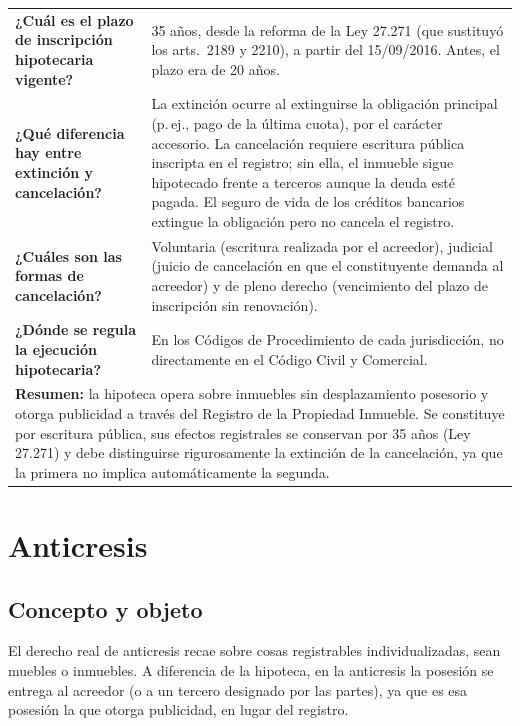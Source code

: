 \documentclass[12pt,oneside]{book}
\begin{document}
\begin{longtable}{p{}p{}}
\textbf{¿Cuál es el plazo de inscripción hipotecaria vigente?} &
35 años, desde la reforma de la Ley 27.271 (que sustituyó los arts.\ 2189 y 2210), a partir del 15/09/2016. Antes, el plazo era de 20 años. \\[0.6em]

\textbf{¿Qué diferencia hay entre extinción y cancelación?} &
La extinción ocurre al extinguirse la obligación principal (p.\,ej., pago de la última cuota), por el carácter accesorio. La cancelación requiere escritura pública inscripta en el registro; sin ella, el inmueble sigue hipotecado frente a terceros aunque la deuda esté pagada. El seguro de vida de los créditos bancarios extingue la obligación pero no cancela el registro. \\[0.6em]

\textbf{¿Cuáles son las formas de cancelación?} &
Voluntaria (escritura realizada por el acreedor), judicial (juicio de cancelación en que el constituyente demanda al acreedor) y de pleno derecho (vencimiento del plazo de inscripción sin renovación). \\[0.6em]

\textbf{¿Dónde se regula la ejecución hipotecaria?} &
En los Códigos de Procedimiento de cada jurisdicción, no directamente en el Código Civil y Comercial. \\

\midrule
\multicolumn{2}{p{\dimexpr0.93\textwidth+2\tabcolsep\relax}}{%
\textbf{Resumen:} la hipoteca opera sobre inmuebles sin desplazamiento posesorio y otorga publicidad a través del Registro de la Propiedad Inmueble. Se constituye por escritura pública, sus efectos registrales se conservan por 35 años (Ley 27.271) y debe distinguirse rigurosamente la extinción de la cancelación, ya que la primera no implica automáticamente la segunda.} \\
\bottomrule
\end{longtable}

\chapter[Anticresis]{Anticresis}

\section{Concepto y objeto}

El derecho real de anticresis recae sobre cosas registrables individualizadas, sean muebles o inmuebles. A diferencia de la hipoteca, en la anticresis la posesión se entrega al acreedor (o a un tercero designado por las partes), ya que es esa posesión la que otorga publicidad, en lugar del registro.
\end{document}
